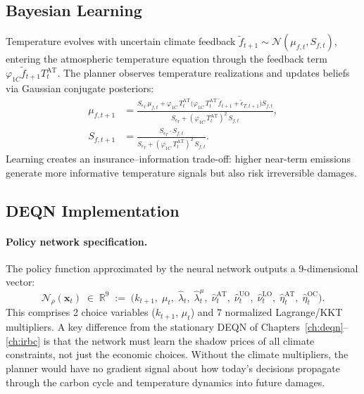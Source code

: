 \documentclass[11pt,a4paper]{report}
\begin{document}
\subsection{Bayesian Learning}

Temperature evolves with uncertain climate feedback $\tilde{f}_{t+1} \sim \mathcal{N}(\mu_{f,t}, S_{f,t})$, entering the atmospheric temperature equation through the feedback term $\varphi_{1C}\tilde{f}_{t+1}T^{\mathrm{AT}}_t$.  The planner observes temperature realizations and updates beliefs via Gaussian conjugate posteriors:
\begin{align}
\mu_{f,t+1} &= \frac{S_{\epsilon_T}\,\mu_{f,t} + \varphi_{1C}\,T^{\mathrm{AT}}_t\bigl(\varphi_{1C}\,T^{\mathrm{AT}}_t\,\tilde{f}_{t+1} + \tilde{\epsilon}_{T,t+1}\bigr)S_{f,t}}{S_{\epsilon_T} + (\varphi_{1C}\,T^{\mathrm{AT}}_t)^2\,S_{f,t}}, \label{eq:bayes_mean}\\
S_{f,t+1} &= \frac{S_{\epsilon_T} \cdot S_{f,t}}{S_{\epsilon_T} + (\varphi_{1C}\,T^{\mathrm{AT}}_t)^2\,S_{f,t}}. \label{eq:bayes_var}
\end{align}
Learning creates an insurance--information trade-off: higher near-term emissions generate more informative temperature signals but also risk irreversible damages.

\subsection{DEQN Implementation}

\paragraph{Policy network specification.}
The policy function approximated by the neural network outputs a 9-dimensional vector:
\begin{equation}
\mathcal{N}_\rho(\bm{x}_t) \;\in\; \mathbb{R}^9
\;:=\; \bigl(k_{t+1},\; \mu_t,\; \hat{\lambda}_t,\; \hat{\lambda}^\mu_t,\; \hat{\nu}^{\mathrm{AT}}_t,\; \hat{\nu}^{\mathrm{UO}}_t,\; \hat{\nu}^{\mathrm{LO}}_t,\; \hat{\eta}^{\mathrm{AT}}_t,\; \hat{\eta}^{\mathrm{OC}}_t\bigr).
\label{eq:iam_nn_output}
\end{equation}
This comprises 2 choice variables ($k_{t+1}$, $\mu_t$) and 7 normalized Lagrange/KKT multipliers.  A key difference from the stationary DEQN of Chapters~\ref{ch:deqn}--\ref{ch:irbc} is that the network must learn the shadow prices of all climate constraints, not just the economic choices.  Without the climate multipliers, the planner would have no gradient signal about how today's decisions propagate through the carbon cycle and temperature dynamics into future damages.
\end{document}
